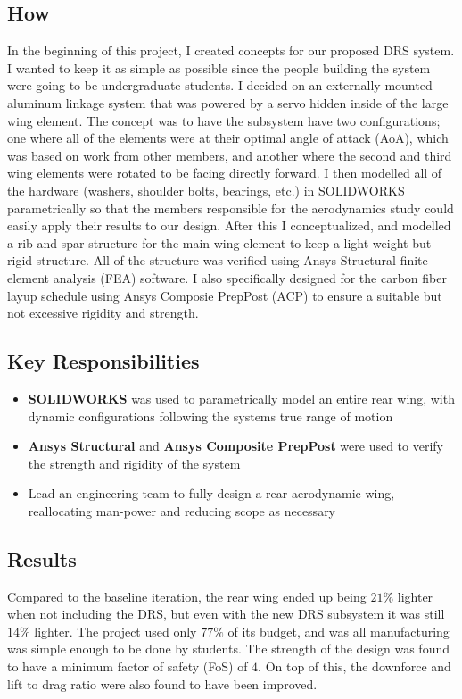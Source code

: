 \documentclass[11pt]{article}
\begin{document}
\subsection*{How}
In the beginning of this project, I created concepts for our proposed DRS system. I wanted to keep it as simple as possible since the people building the system were going to be undergraduate students. I decided on an externally mounted aluminum linkage system that was powered by a servo hidden inside of the large wing element. The concept was to have the subsystem have two configurations; one where all of the elements were at their optimal angle of attack (AoA), which was based on work from other members, and another where the second and third wing elements were rotated to be facing directly forward. I then modelled all of the hardware (washers, shoulder bolts, bearings, etc.) in SOLIDWORKS parametrically so that the members responsible for the aerodynamics study could easily apply their results to our design. After this I conceptualized, and modelled a rib and spar structure for the main wing element to keep a light weight but rigid structure. All of the structure was verified using Ansys Structural finite element analysis (FEA) software. I also specifically designed for the carbon fiber layup schedule using Ansys Composie PrepPost (ACP) to ensure a suitable but not excessive rigidity and strength.
\subsection*{Key Responsibilities}
\begin{itemize}
    \item \textbf{SOLIDWORKS} was used to parametrically model an entire rear wing, with dynamic configurations following the systems true range of motion
    \item \textbf{Ansys Structural} and \textbf{Ansys Composite PrepPost} were used to verify the strength and rigidity of the system
    \item Lead an engineering team to fully design a rear aerodynamic wing, reallocating man-power and reducing scope as necessary
\end{itemize}
\subsection*{Results}
Compared to the baseline iteration, the rear wing ended up being $21 \%$ lighter when not including the DRS, but even with the new DRS subsystem it was still $14 \%$ lighter. The project used only $77 \%$ of its budget, and was all manufacturing was simple enough to be done by students. The strength of the design was found to have a minimum factor of safety (FoS) of $4$. On top of this, the downforce and lift to drag ratio were also found to have been improved.
\end{document}
